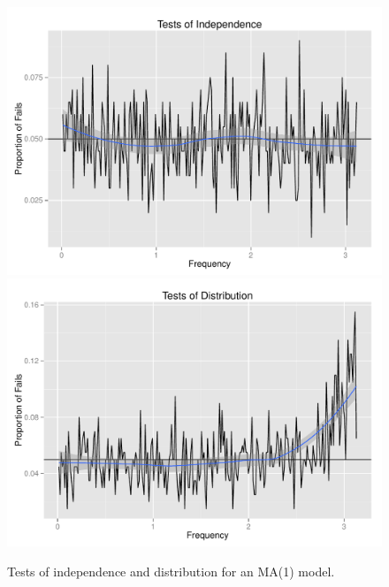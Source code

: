 \documentclass{article}\usepackage[]{graphicx}\usepackage[]{color}
\newenvironment{knitrout}{}{} %
\theoremstyle{plain}
\begin{document}
\begin{knitrout}
\color{fgcolor}\begin{figure}[H]

\includegraphics[width=.49\textwidth]{figure/tests-ma11} 
\includegraphics[width=.49\textwidth]{figure/tests-ma12} \caption[Tests of independence and distribution for an MA(1) model]{Tests of independence and distribution for an MA(1) model.\label{fig:tests-ma1}}
\end{figure}


\end{knitrout}
\end{document}
